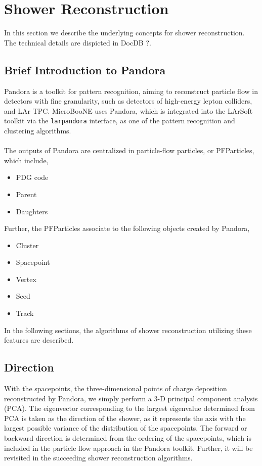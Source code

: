 \section{Shower Reconstruction}

In this section we describe the underlying concepts for shower reconstruction.
The technical details are dispicted in DocDB ?.

\subsection{Brief Introduction to Pandora}

Pandora is a toolkit for pattern recognition, aiming to 
reconstruct particle flow in detectors with fine granularity, such as
detectors of high-energy lepton colliders, and LAr TPC.
MicroBooNE uses Pandora, which is integrated into the LArSoft toolkit
via the \texttt{larpandora} interface,
as one of the pattern recognition and clustering algorithms. \\
\\
The outputs of Pandora are centralized in particle-flow particles, 
or PFParticles, which include,
\begin{itemize}
\item PDG code
\item Parent
\item Daughters
\end{itemize}
Further, the PFParticles associate to the following objects created
by Pandora,
\begin{itemize}
\item Cluster
\item Spacepoint
\item Vertex
\item Seed
\item Track
\end{itemize}

In the following sections, the algorithms of shower reconstruction 
utilizing these features are described.

\subsection{Direction}

With the spacepoints, the three-dimensional points of charge deposition
reconstructed by Pandora, we simply perform a 3-D principal component 
analysis (PCA).
The eigenvector corresponding to the largest eigenvalue determined from
PCA is taken as the direction of the shower, as it represents the axis
with the largest possible variance of the distribution of the spacepoints.
The forward or backward direction is determined from the ordering of
the spacepoints, which is included in the particle flow approach in
the Pandora toolkit.  Further, it will be revisited in the succeeding
shower reconstruction algorithms.

